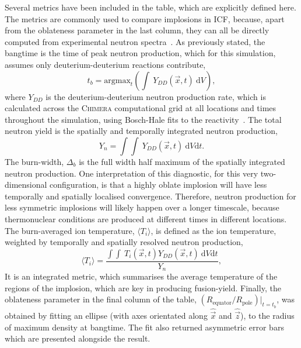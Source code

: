 Several metrics have been included in the table, which are explicitly defined here.
The metrics are commonly used to compare implosions in \ac{ICF}, because, apart from the oblateness parameter in the last column, they can all be directly computed from experimental neutron spectra~\cite{frenje_nuclear_2020}.
As previously stated, the bangtime is the time of peak neutron production, which for this simulation, assumes only deuterium-deuterium reactions contribute,
\begin{equation}
    t_b = \text{argmax}_t \left( \int\ Y_{DD}(\vec{x},t)\ \text{d}V \right),
\end{equation}
where $Y_{DD}$ is the deuterium-deuterium neutron production rate, which is calculated across the \textsc{Chimera} computational grid at all locations and times throughout the simulation, using Bosch-Hale fits to the reactivity~\cite{bosch_improved_1992}.
The total neutron yield is the spatially and temporally integrated neutron production,
\begin{equation}
    Y_{n} = \int\int\ Y_{DD}(\vec{x},t)\ \text{d}V\text{d}t.
\end{equation}
The burn-width, $\Delta_b$ is the full width half maximum of the spatially integrated neutron production.
One interpretation of this diagnostic, for this very two-dimensional configuration, is that a highly oblate implosion will have less temporally and spatially localised convergence.
Therefore, neutron production for less symmetric implosions will likely happen over a longer timescale, because thermonuclear conditions are produced at different times in different locations.
The burn-averaged ion temperature, $\langle T_i \rangle$, is defined as the ion temperature, weighted by temporally and spatially resolved neutron production,
\begin{equation}
    \langle T_i \rangle = \frac{\int\int\ T_i(\vec{x},t) Y_{DD}(\vec{x},t)\ \text{d}V\text{d}t}{Y_{n}},
\end{equation}
It is an integrated metric, which summarises the average temperature of the regions of the implosion, which are key in producing fusion-yield.
Finally, the oblateness parameter in the final column of the table, $(R_{\text{equator}}/R_{\text{pole}})|_{t=t_b}$, was obtained by fitting an ellipse (with axes orientated along $\hat{\vec{x}}$ and $\hat{\vec{z}}$), to the radius of maximum density at bangtime.
The fit also returned asymmetric error bars which are presented alongside the result.

